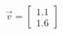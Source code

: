 \documentclass[preview]{standalone}
\begin{document}
\begin{align*}
\vec{v}=\begin{bmatrix}1.1\\1.6\end{bmatrix}
\end{align*}
\end{document}
